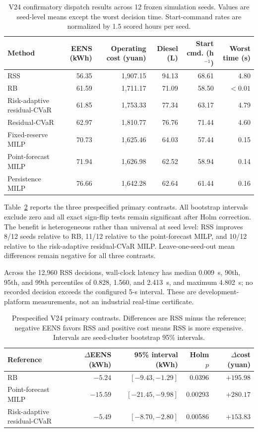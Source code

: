 \begin{table}[!t]
\caption{V24 confirmatory dispatch results across 12 frozen simulation seeds.
Values are seed-level means except the worst decision time. Start-command rates
are normalized by 1.5 scored hours per seed.}
\label{tab:dispatch-results}
\centering
\scriptsize
\setlength{\tabcolsep}{3.5pt}
\begin{tabular}{@{}lrrrrr@{}}
\toprule
Method & EENS (kWh) & Operating cost (yuan) & Diesel (L) & Start cmd. (h$^{-1}$) & Worst time (s) \\
\midrule
RSS & 56.35 & 1,907.15 & 94.13 & 68.61 & 4.80 \\
RB & 61.59 & 1,711.17 & 71.09 & 58.50 & $<0.01$ \\
Risk-adaptive residual-CVaR & 61.85 & 1,753.33 & 77.34 & 63.17 & 4.79 \\
Residual-CVaR & 62.97 & 1,810.77 & 76.76 & 71.44 & 4.60 \\
Fixed-reserve MILP & 70.73 & 1,625.46 & 64.03 & 57.44 & 0.15 \\
Point-forecast MILP & 71.94 & 1,626.98 & 62.52 & 58.94 & 0.14 \\
Persistence MILP & 76.66 & 1,642.28 & 62.64 & 61.44 & 0.16 \\
\bottomrule
\end{tabular}
\end{table}

Table~\ref{tab:primary-contrasts} reports the three prespecified primary
contrasts. All bootstrap intervals exclude zero and all exact sign-flip tests
remain significant after Holm correction. The benefit is heterogeneous rather
than universal at seed level: RSS improves 8/12 seeds relative to RB, 11/12
relative to the point-forecast MILP, and 10/12 relative to the risk-adaptive
residual-CVaR MILP. Leave-one-seed-out mean differences remain negative for all
three contrasts.

Across the 12,960 RSS decisions, wall-clock latency has median 0.009~s,
90th, 95th, and 99th percentiles of 0.828, 1.560, and 2.413~s, and maximum
4.802~s; no recorded decision exceeds the configured 5-s interval. These are
development-platform measurements, not an industrial real-time certificate.

\begin{table}[!t]
\caption{Prespecified V24 primary contrasts. Differences are RSS minus the
reference; negative EENS favors RSS and positive cost means RSS is more
expensive. Intervals are seed-cluster bootstrap 95\% intervals.}
\label{tab:primary-contrasts}
\centering
\scriptsize
\setlength{\tabcolsep}{4pt}
\begin{tabular}{@{}lrrrr@{}}
\toprule
Reference & $\Delta$EENS (kWh) & 95\% interval (kWh) & Holm $p$ & $\Delta$cost (yuan) \\
\midrule
RB & $-5.24$ & $[-9.43,-1.29]$ & 0.0396 & $+195.98$ \\
Point-forecast MILP & $-15.59$ & $[-21.45,-9.98]$ & 0.00293 & $+280.17$ \\
Risk-adaptive residual-CVaR & $-5.49$ & $[-8.70,-2.80]$ & 0.00586 & $+153.83$ \\
\bottomrule
\end{tabular}
\end{table}

